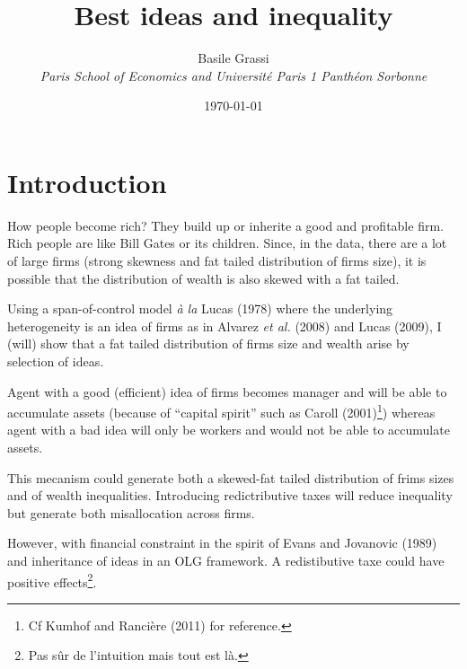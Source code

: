 \documentclass[12pt]{article}
\title{Best ideas and inequality}
\author{Basile Grassi\\
\small{\emph{Paris School of Economics and Université Paris 1 Panthéon Sorbonne}}
}
\date{\today}
\begin{document}
\maketitle

\begin{abstract}

\end{abstract}



\section{Introduction}
How people become rich? They build up or inherite a good and profitable firm. Rich people are like Bill Gates or its children. Since, in the data, there are a lot of large firms (strong skewness and fat tailed distribution of firms size), it is possible that the distribution of wealth is also skewed with a fat tailed.

Using a span-of-control model \emph{\`a la} Lucas (1978)\nocite{Luca78} where the underlying heterogeneity is an idea of firms as in Alvarez \emph{et al.} (2008)\nocite{Alva08} and Lucas (2009)\nocite{Luca09}, I (will) show that a fat tailed distribution of firms size and wealth arise by selection of ideas.

Agent with a good (efficient) idea of firms becomes manager and will be able to accumulate assets (because of ``capital spirit'' such as Caroll (2001)\footnote{Cf Kumhof and Rancière (2011)\nocite{Kumh11} for reference.}) whereas agent with a bad idea will only be workers and would not be able to accumulate assets.

This mecanism could generate both a skewed-fat tailed distribution of frims sizes and of wealth inequalities. Introducing redictributive taxes will reduce inequality but generate both misallocation across firms. 

However, with financial constraint in the spirit of Evans and Jovanovic (1989)\nocite{Evan89} and inheritance of ideas in an OLG framework. A redistibutive taxe could have positive effects\footnote{Pas s\^ur de l'intuition mais tout est l\`a.}.


\clearpage



\end{document}
